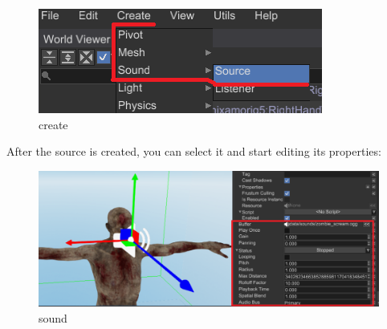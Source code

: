 \documentclass[
]{book}
\theoremstyle{definition}
\theoremstyle{definition}
\theoremstyle{definition}
\theoremstyle{definition}
\theoremstyle{remark}
\begin{document}
\begin{figure}
\centering
\includegraphics{images/sound_create.png}
\caption{create}
\end{figure}

After the source is created, you can select it and start editing its properties:

\begin{figure}
\centering
\includegraphics{images/sound_sound.png}
\caption{sound}
\end{figure}
\end{document}
